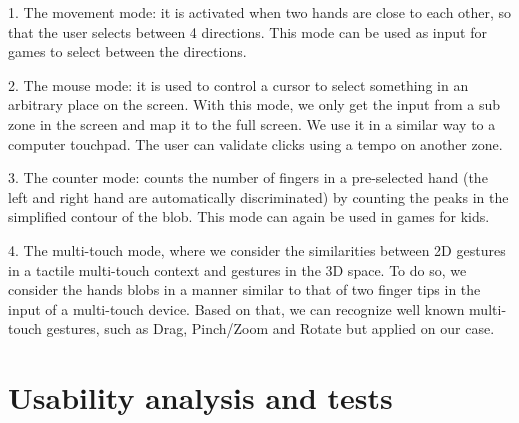 \documentclass{llncs}
\begin{document}
1. The movement mode:
it is activated when two hands are close to each other, so that the user selects between 4 directions. This mode can be used as input for games to select between the directions.

2. The mouse mode:
it is used to control a cursor to select something in an arbitrary place on the screen. With this mode, we only get the input from a sub zone in the screen and map it to the full screen. We use it in a similar way to a computer touchpad.
The user can validate clicks using a tempo on another zone.

3. The counter mode: counts the number of fingers in a pre-selected hand (the left and right hand are automatically discriminated) by counting the peaks in the simplified contour of the blob. This mode can again be used in games for kids.

4. The multi-touch mode, where we consider the similarities between 2D gestures in a tactile multi-touch context and gestures in the 3D space. To do so, we consider the hands blobs in a manner similar to that of two finger tips in the input of a multi-touch device. Based on that, we can recognize well known multi-touch gestures, such as Drag, Pinch/Zoom and Rotate but applied on our case.


\section{Usability analysis and tests}




\end{document}
